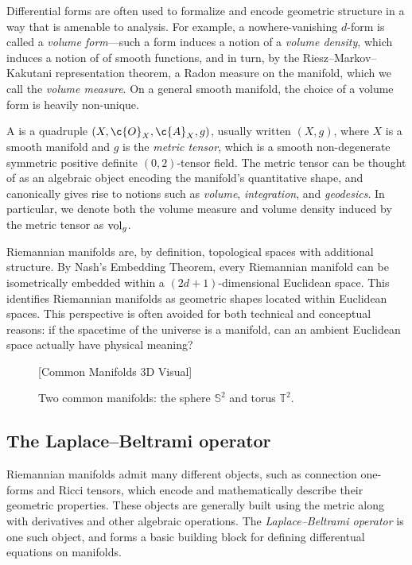 \documentclass[11pt]{book}
\begin{document}
Differential forms are often used to formalize and encode geometric structure in a way that is amenable to analysis.
For example, a nowhere-vanishing $d$-form is called a \emph{volume form}---such a form induces a notion of a \emph{volume density}, which induces a notion of  of smooth functions, and in turn, by the Riesz--Markov--Kakutani representation theorem, a Radon measure on the manifold, which we call the \emph{volume measure}.
On a general smooth manifold, the choice of a volume form is heavily non-unique.

A  is a quadruple $(X,\c{O}_X,\c{A}_X,g)$, usually written $(X,g)$, where $X$ is a smooth manifold and $g$ is the \emph{metric tensor}, which is a smooth non-degenerate symmetric positive definite $(0,2)$-tensor field.
The metric tensor can be thought of as an algebraic object encoding the manifold's quantitative shape, and canonically gives rise to notions such as \emph{volume}, \emph{integration}, and \emph{geodesics}.
In particular, we denote both the volume measure and volume density induced by the metric tensor as $\operatorname{vol}_g$.

Riemannian manifolds are, by definition, topological spaces with additional structure.
By Nash's Embedding Theorem, every Riemannian manifold can be isometrically embedded within a $(2d+1)$-dimensional Euclidean space.
This identifies Riemannian manifolds as geometric shapes located within Euclidean spaces.
This perspective is often avoided for both technical and conceptual reasons: if the spacetime of the universe is a manifold, can an ambient Euclidean space actually have physical meaning?

\begin{figure}
\vspace*{10ex}
[Common Manifolds 3D Visual]
\vspace*{10ex}
\caption{Two common manifolds: the sphere $\mathbb{S}^2$ and torus $\mathbb{T}^2$.}
\label{fig:common-manifolds}
\end{figure}

\subsection{The Laplace--Beltrami operator}

Riemannian manifolds admit many different objects, such as connection one-forms and Ricci tensors, which encode and mathematically describe their geometric properties.
These objects are generally built using the metric along with derivatives and other algebraic operations.
The \emph{Laplace--Beltrami operator} is one such object, and forms a basic building block for defining differentual equations on manifolds.
\end{document}
